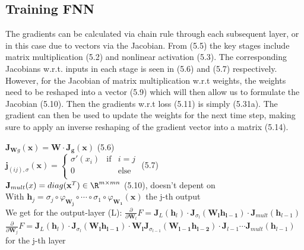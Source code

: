 \documentclass[english]{latex4ei/latex4ei_sheet}
\begin{document}
\begin{sectionbox}
\subsection{Training FNN}
The gradients can be calculated via chain rule through each subsequent layer, or in this case due to vectors via the Jacobian. From (5.5) the key stages include matrix multiplication (5.2) and nonlinear activation (5.3). The corresponding Jacobians w.r.t. inputs in each stage is seen in (5.6) and (5.7) respectively. However, for the Jacobian of matrix multiplication w.r.t weights, the weights need to be reshaped into a vector (5.9) which will then allow us to formulate the Jacobian (5.10). Then the gradients w.r.t loss (5.11) is simply (5.31a). The gradient can then be used to update the weights for the next time step, making sure to apply an inverse reshaping of the gradient vector into a matrix (5.14).
\begin{emphbox}
    $\mathbf{J}_{\mathbf{W} g}(\mathbf{x})=\mathbf{W\cdot J_g}(\mathbf{x})$ (5.6)\\
    $\mathbf{j}_{(ij),\sigma}(\mathbf{x}) = \left\{ \begin{array}{rcl}
     \sigma'(x_i) & \mbox{if}
& i=j \\ 0 & & \mbox{else}\\
\end{array}\right.$ (5.7)\\
$\mathbf{J}_{mult}(x)=diag(\mathbf{x}^T)\in\R^{m\times mn}$ (5.10), doesn't depent on\\
With $\mathbf{h}_j=\sigma_j\circ\varphi_\mathbf{W_j}\circ\cdots\circ\sigma_1\circ\varphi_{\mathbf{W_1}}(\mathbf{x})$ the j-th output\\
We get for the output-layer (L): $\frac{\partial}{\partial\mathbf{W}_l}F=\mathbf{J}_L(\mathbf{h}_l)\cdot\mathbf{J}_{\sigma_l}(\mathbf{W_lh_{l-1}})\cdot\mathbf{J}_{mult}(\mathbf{h}_{l-1})$\\

$\frac{\partial}{\partial\mathbf{W}_j}F=\mathbf{J}_L(\mathbf{h}_l)\cdot\mathbf{J}_{\sigma_l}(\mathbf{W_lh_{l-1}})\cdot\mathbf{W_l}\mathbf{J}_{\sigma_{l-1}}(\mathbf{W_{l-1}h_{l-2}})\cdot\mathbf{J}_{l-1}\cdots \mathbf{J}_{mult}(\mathbf{h}_{l-1})$ for the j-th layer
\end{emphbox}
\end{sectionbox}
\end{document}

